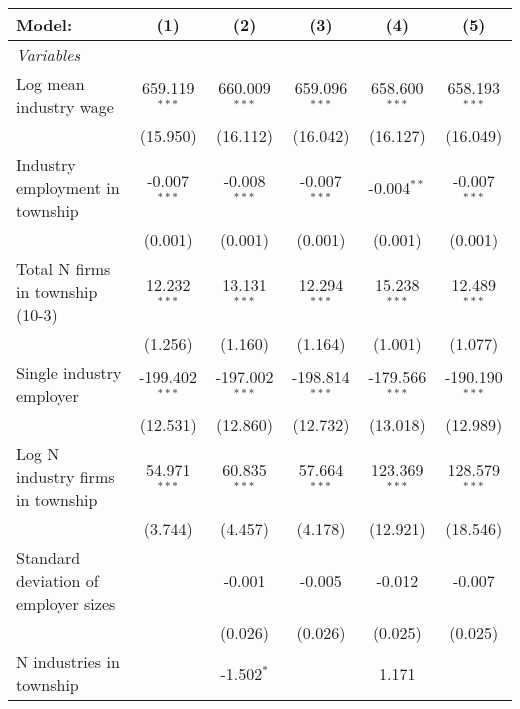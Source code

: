 \begingroup
\centering
\begin{tabular}{lccccc}
   \tabularnewline \midrule \midrule
   Model:                               & (1)              & (2)              & (3)              & (4)              & (5)\\  
   \midrule
   \emph{Variables}\\
   Log mean industry wage               & 659.119$^{***}$  & 660.009$^{***}$  & 659.096$^{***}$  & 658.600$^{***}$  & 658.193$^{***}$\\   
                                        & (15.950)         & (16.112)         & (16.042)         & (16.127)         & (16.049)\\   
   Industry employment in township      & -0.007$^{***}$   & -0.008$^{***}$   & -0.007$^{***}$   & -0.004$^{**}$    & -0.007$^{***}$\\   
                                        & (0.001)          & (0.001)          & (0.001)          & (0.001)          & (0.001)\\   
   Total N firms in township (10-3)     & 12.232$^{***}$   & 13.131$^{***}$   & 12.294$^{***}$   & 15.238$^{***}$   & 12.489$^{***}$\\   
                                        & (1.256)          & (1.160)          & (1.164)          & (1.001)          & (1.077)\\   
   Single industry employer             & -199.402$^{***}$ & -197.002$^{***}$ & -198.814$^{***}$ & -179.566$^{***}$ & -190.190$^{***}$\\   
                                        & (12.531)         & (12.860)         & (12.732)         & (13.018)         & (12.989)\\   
   Log N industry firms in township     & 54.971$^{***}$   & 60.835$^{***}$   & 57.664$^{***}$   & 123.369$^{***}$  & 128.579$^{***}$\\   
                                        & (3.744)          & (4.457)          & (4.178)          & (12.921)         & (18.546)\\   
   Standard deviation of employer sizes &                  & -0.001           & -0.005           & -0.012           & -0.007\\   
                                        &                  & (0.026)          & (0.026)          & (0.025)          & (0.025)\\   
   N industries in township             &                  & -1.502$^{*}$     &                  & 1.171            &   \\   

\end{tabular}
